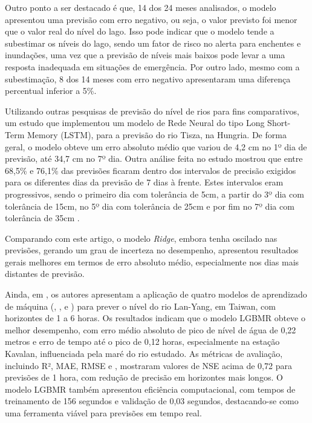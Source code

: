 Outro ponto a ser destacado é que, 14 dos 24 meses analisados, o modelo apresentou uma previsão com erro negativo, ou seja, o valor previsto foi menor que o valor real do nível do lago. Isso pode indicar que o modelo tende a subestimar os níveis do lago, sendo um fator de risco no alerta para enchentes e inundações, uma vez que a previsão de níveis mais baixos pode levar a uma resposta inadequada em situações de emergência. Por outro lado, mesmo com a subestimação, 8 dos 14 meses com erro negativo apresentaram uma diferença percentual inferior a 5\%.

Utilizando outras pesquisas de previsão do nível de rios para fins comparativos, um estudo que implementou um modelo de Rede Neural do tipo Long Short-Term Memory (LSTM), para a previsão do rio Tisza, na Hungria. De forma geral, o modelo obteve um erro absoluto médio que variou de 4,2 cm no 1º dia de previsão, até 34,7 cm no 7º dia. Outra análise feita no estudo mostrou que entre 68,5\% e 76,1\% das previsões ficaram dentro dos intervalos de precisão exigidos para os diferentes dias da previsão de 7 dias à frente. Estes intervalos eram progressivos, sendo o primeiro dia com tolerância de 5cm, a partir do 3º dia com tolerância de 15cm, no 5º dia com tolerância de 25cm e por fim no 7º dia com tolerância de 35cm \cite{Vizi2023}.

Comparando com este artigo, o modelo \textit{Ridge}, embora tenha oscilado nas previsões, gerando um grau de incerteza no desempenho, apresentou resultados gerais melhores em termos de erro absoluto médio, especialmente nos dias mais distantes de previsão.

Ainda, em \cite{Guo2021}, os autores apresentam a aplicação de quatro modelos de aprendizado de máquina (, ,  e ) para prever o nível do rio Lan-Yang, em Taiwan, com horizontes de 1 a 6 horas. Os resultados indicam que o modelo LGBMR obteve o melhor desempenho, com erro médio absoluto de pico de nível de água de 0,22 metros e erro de tempo até o pico de 0,12 horas, especialmente na estação Kavalan, influenciada pela maré do rio estudado. As métricas de avaliação, incluindo R², MAE, RMSE e , mostraram valores de NSE acima de 0,72 para previsões de 1 hora, com redução de precisão em horizontes mais longos. O modelo LGBMR também apresentou eficiência computacional, com tempos de treinamento de 156 segundos e validação de 0,03 segundos, destacando-se como uma ferramenta viável para previsões em tempo real.

